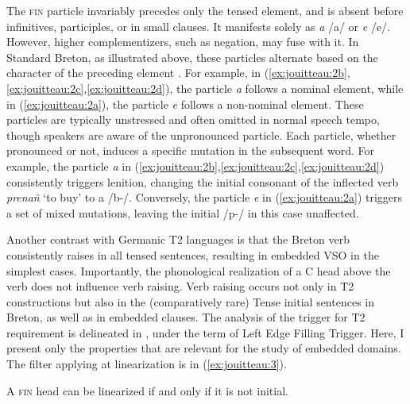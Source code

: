 \documentclass[output=paper,colorlinks,citecolor=brown]{langscibook}
\begin{document}
The \textsc{fin} particle invariably precedes only the tensed element, and is absent before infinitives, participles, or in small clauses. It manifests solely as \textit{a} /a/ or \textit{e} /e/. However, higher complementizers, such as negation, may fuse with it. In Standard Breton, as illustrated above, these particles alternate based on the  character of the preceding element \citep{mj:Rezac2004}. For example, in (\ref{ex:jouitteau:2b},\ref{ex:jouitteau:2c},\ref{ex:jouitteau:2d}), the particle \textit{a} follows a nominal element, while in (\ref{ex:jouitteau:2a}), the particle \textit{e} follows a non-nominal element. These particles are typically unstressed and often omitted in normal speech tempo, though speakers are aware of the unpronounced particle. Each particle, whether pronounced or not, induces a specific mutation in the subsequent word. For example, the particle \textit{a} in (\ref{ex:jouitteau:2b},\ref{ex:jouitteau:2c},\ref{ex:jouitteau:2d}) consistently triggers lenition, changing the initial consonant of the inflected verb \textit{prenañ} ‘to buy’ to a /b-/. Conversely, the particle \textit{e} in (\ref{ex:jouitteau:2a}) triggers a set of mixed mutations, leaving the initial /p-/ in this case unaffected.

Another contrast with Germanic T2 languages is that the Breton verb consistently raises in all tensed sentences, resulting in embedded VSO in the simplest cases. Importantly, the phonological realization of a C head above the verb does not influence verb raising. Verb raising occurs not only in T2 constructions but also in the (comparatively rare) Tense initial sentences in Breton, as well as in embedded clauses. The analysis of the trigger for T2 requirement is delineated in \citet{mj:Jouitteau2020}, under the term of Left Edge Filling Trigger. Here, I present only the properties that are relevant for the study of embedded domains. The filter applying at linearization is in (\ref{ex:jouitteau:3}). 

\ea \label{ex:jouitteau:3}
A \textsc{fin} head can be linearized if and only if it is not initial.
\z 
\end{document}
